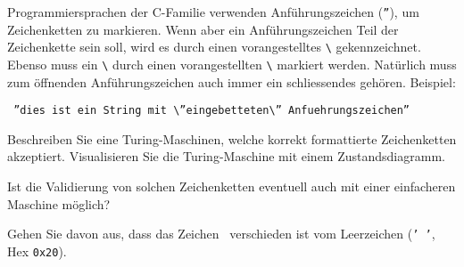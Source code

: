 Programmiersprachen der C-Familie verwenden Anführungszeichen
({\tt\textquotedblright}), um Zeichenketten zu markieren.
Wenn aber ein Anführungszeichen Teil der
Zeichenkette sein soll, wird es durch einen vorangestelltes {\tt\textbackslash}
gekennzeichnet.
Ebenso muss ein {\tt\textbackslash} durch einen vorangestellten {\tt\textbackslash}
markiert werden.
Natürlich muss zum öffnenden Anführungszeichen
auch immer ein schliessendes gehören. Beispiel:
\begin{center}
\tt
\textquotedblright dies ist ein String mit \textbackslash\textquotedblright eingebetteten\textbackslash\textquotedblright\ Anfuehrungszeichen\textquotedblright
\end{center}
\begin{teilaufgaben}
\item
Beschreiben Sie eine Turing-Maschinen, welche korrekt formattierte
Zeichenketten akzeptiert.
Visualisieren Sie die Turing-Maschine mit einem Zustandsdiagramm.
\item
Ist die Validierung von solchen Zeichenketten eventuell auch mit einer
einfacheren Maschine möglich?
\end{teilaufgaben}


\begin{hinweis}
Gehen Sie davon aus, dass das Zeichen \blank\ verschieden ist
vom Leerzeichen ({\tt ' '}, Hex {\tt 0x20}).
\end{hinweis}

